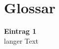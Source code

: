 \renewcommand{\glossaryname}{Glossar}
\printglossaries
\section*{Glossar}
\textbf{Eintrag 1} \\
langer Text
\\
